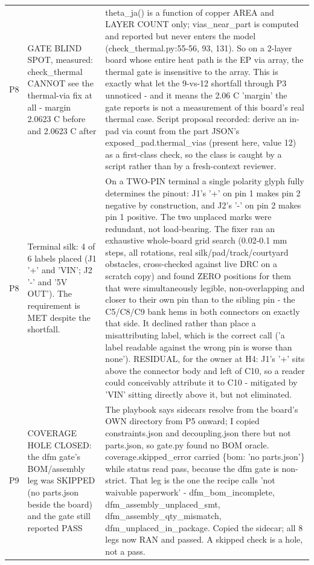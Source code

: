 \documentclass[11pt,a4paper]{article}
\begin{document}
{\begin{longtable}{lp{5.2cm}p{7.2cm}}
P8 & GATE BLIND SPOT, measured: check\_thermal CANNOT see the thermal-via fix at all - margin 2.0623 C before and 2.0623 C after & theta\_ja() is a function of copper AREA and LAYER COUNT only; vias\_near\_part is computed and reported but never enters the model (check\_thermal.py:55-56, 93, 131). So on a 2-layer board whose entire heat path is the EP via array, the thermal gate is insensitive to the array. This is exactly what let the 9-vs-12 shortfall through P3 unnoticed - and it means the 2.06 C 'margin' the gate reports is not a measurement of this board's real thermal case. Script proposal recorded: derive an in-pad via count from the part JSON's exposed\_pad.thermal\_vias (present here, value 12) as a first-class check, so the class is caught by a script rather than by a fresh-context reviewer. \\
P8 & Terminal silk: 4 of 6 labels placed (J1 '+' and 'VIN'; J2 '-' and '5V OUT'). The requirement is MET despite the shortfall. & On a TWO-PIN terminal a single polarity glyph fully determines the pinout: J1's '+' on pin 1 makes pin 2 negative by construction, and J2's '-' on pin 2 makes pin 1 positive. The two unplaced marks were redundant, not load-bearing. The fixer ran an exhaustive whole-board grid search (0.02-0.1 mm steps, all rotations, real silk/pad/track/courtyard obstacles, cross-checked against live DRC on a scratch copy) and found ZERO positions for them that were simultaneously legible, non-overlapping and closer to their own pin than to the sibling pin - the C5/C8/C9 bank hems in both connectors on exactly that side. It declined rather than place a misattributing label, which is the correct call ('a label readable against the wrong pin is worse than none'). RESIDUAL, for the owner at H4: J1's '+' sits above the connector body and left of C10, so a reader could conceivably attribute it to C10 - mitigated by 'VIN' sitting directly above it, but not eliminated. \\
P9 & COVERAGE HOLE CLOSED: the dfm gate's BOM/assembly leg was SKIPPED (no parts.json beside the board) and the gate still reported PASS & The playbook says sidecars resolve from the board's OWN directory from P5 onward; I copied constraints.json and decoupling.json there but not parts.json, so gate.py found no BOM oracle. coverage.skipped\_error carried \{bom: 'no parts.json'\} while status read pass, because the dfm gate is non-strict. That leg is the one the recipe calls 'not waivable paperwork' - dfm\_bom\_incomplete, dfm\_assembly\_unplaced\_smt, dfm\_assembly\_qty\_mismatch, dfm\_unplaced\_in\_package. Copied the sidecar; all 8 legs now RAN and passed. A skipped check is a hole, not a pass. \\

\end{longtable}}
\end{document}
